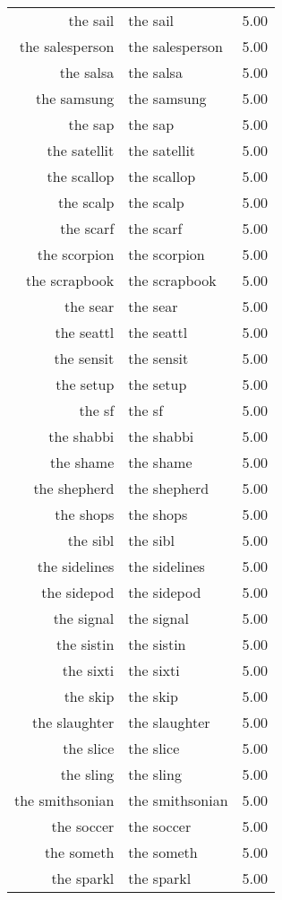 \begin{table}[ht]
\begin{tabular}{rlr}
  the sail & the sail & 5.00 \\ 
  the salesperson & the salesperson & 5.00 \\ 
  the salsa & the salsa & 5.00 \\ 
  the samsung & the samsung & 5.00 \\ 
  the sap & the sap & 5.00 \\ 
  the satellit & the satellit & 5.00 \\ 
  the scallop & the scallop & 5.00 \\ 
  the scalp & the scalp & 5.00 \\ 
  the scarf & the scarf & 5.00 \\ 
  the scorpion & the scorpion & 5.00 \\ 
  the scrapbook & the scrapbook & 5.00 \\ 
  the sear & the sear & 5.00 \\ 
  the seattl & the seattl & 5.00 \\ 
  the sensit & the sensit & 5.00 \\ 
  the setup & the setup & 5.00 \\ 
  the sf & the sf & 5.00 \\ 
  the shabbi & the shabbi & 5.00 \\ 
  the shame & the shame & 5.00 \\ 
  the shepherd & the shepherd & 5.00 \\ 
  the shops & the shops & 5.00 \\ 
  the sibl & the sibl & 5.00 \\ 
  the sidelines & the sidelines & 5.00 \\ 
  the sidepod & the sidepod & 5.00 \\ 
  the signal & the signal & 5.00 \\ 
  the sistin & the sistin & 5.00 \\ 
  the sixti & the sixti & 5.00 \\ 
  the skip & the skip & 5.00 \\ 
  the slaughter & the slaughter & 5.00 \\ 
  the slice & the slice & 5.00 \\ 
  the sling & the sling & 5.00 \\ 
  the smithsonian & the smithsonian & 5.00 \\ 
  the soccer & the soccer & 5.00 \\ 
  the someth & the someth & 5.00 \\ 
  the sparkl & the sparkl & 5.00 \\ 

\end{tabular}
\end{table}
